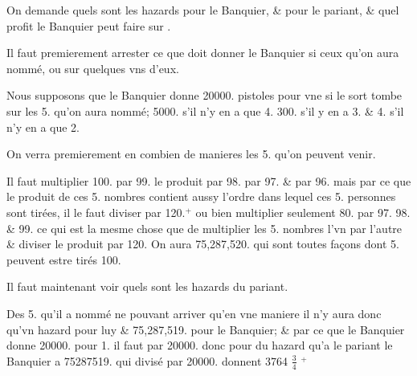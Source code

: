 \documentclass[11pt,a4paper]{article}
\begin{document}
On demande quels sont les hazards pour le Banquier, \& pour le pariant, \& quel profit le Banquier peut faire sur \struck{\ill{}} .

Il faut premierement arrester ce que doit donner le Banquier si  ceux qu'on aura nommé, ou sur quelques vns d'eux.

Nous supposons que le Banquier donne 20000. pistoles pour vne si le sort tombe sur les 5. qu'on aura nommé; \struck{\ill{}} 5000. s'il n'y en a que 4. \struck{\ill{}} 300. s'il y en a 3. \& 4. s'il n'y en a que 2.

On verra premierement en combien de manieres les 5. qu'on   peuvent venir.

Il faut multiplier 100. par 99. le produit par 98. par 97. \& par 96. mais par ce que le produit de ces 5. nombres contient aussy l'ordre dans lequel ces 5. personnes sont tirées, il le faut diviser par 120.${}^{+}$ ou bien multiplier seulement 80. par 97. 98. \& 99. ce qui est la mesme chose que de multiplier les 5. nombres l'vn par l'autre \& diviser le produit par 120. On aura 75,287,520. qui sont toutes  façons dont 5.   peuvent estre tirés    100.

Il faut maintenant voir quels sont les hazards du pariant.

Des 5. qu'il a nommé ne pouvant arriver qu'en  vne maniere il n'y aura donc qu'vn hazard pour luy \& 75,287,519. pour le Banquier; \& par ce que le Banquier donne 20000. pour 1. il faut   par 20000.   donc pour  \ill{} du hazard qu'a le pariant  le Banquier  a 75287519. qui divisé par 20000. donnent 3764 $\frac{3}{4}$ ${}^{+}$
\end{document}
